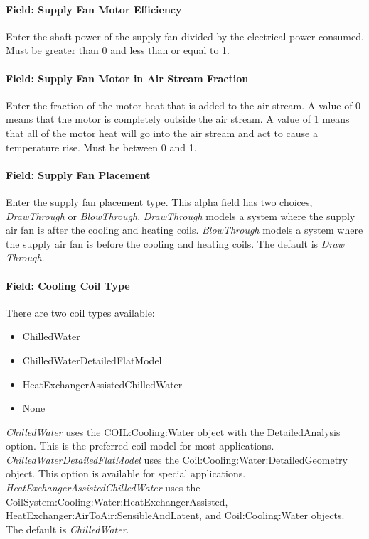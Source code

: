 \paragraph{Field: Supply Fan Motor Efficiency}\label{field-supply-fan-motor-efficiency-10}

Enter the shaft power of the supply fan divided by the electrical power consumed. Must be greater than 0 and less than or equal to 1.

\paragraph{Field: Supply Fan Motor in Air Stream Fraction}\label{field-supply-fan-motor-in-air-stream-fraction-6}

Enter the fraction of the motor heat that is added to the air stream. A value of 0 means that the motor is completely outside the air stream. A value of 1 means that all of the motor heat will go into the air stream and act to cause a temperature rise. Must be between 0 and 1.

\paragraph{Field: Supply Fan Placement}\label{field-supply-fan-placement-9}

Enter the supply fan placement type. This alpha field has two choices, \emph{DrawThrough} or \emph{BlowThrough}. \emph{DrawThrough} models a system where the supply air fan is after the cooling and heating coils. \emph{BlowThrough} models a system where the supply air fan is before the cooling and heating coils. The default is \emph{Draw Through}.

\paragraph{Field: Cooling Coil Type}\label{field-cooling-coil-type-10}

There are two coil types available:

\begin{itemize}
\item
  ChilledWater
\item
  ChilledWaterDetailedFlatModel
\item
  HeatExchangerAssistedChilledWater
\item
  None
\end{itemize}

\emph{ChilledWater} uses the COIL:Cooling:Water object with the DetailedAnalysis option. This is the preferred coil model for most applications. \emph{ChilledWaterDetailedFlatModel} uses the Coil:Cooling:Water:DetailedGeometry object. This option is available for special applications. \emph{HeatExchangerAssistedChilledWater} uses the CoilSystem:Cooling:Water:HeatExchangerAssisted, HeatExchanger:AirToAir:SensibleAndLatent, and Coil:Cooling:Water objects. The default is \emph{ChilledWater}.

